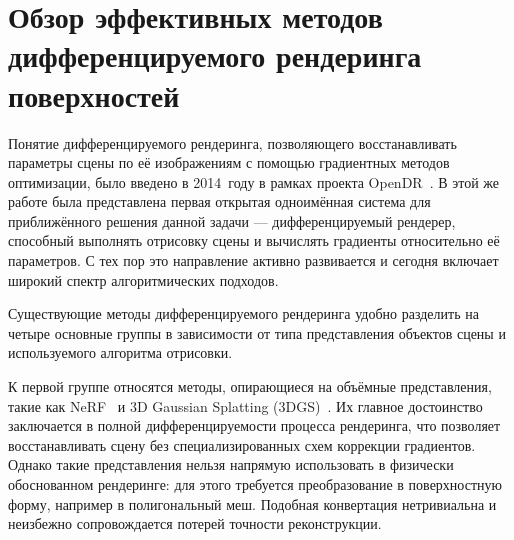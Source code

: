 \chapter{Обзор эффективных методов дифференцируемого рендеринга поверхностей}
\label{ch:chap1}

Понятие дифференцируемого рендеринга, позволяющего восстанавливать параметры
сцены по её изображениям с помощью градиентных методов оптимизации, было
введено в 2014~году в рамках проекта OpenDR~\cite{OpenDR2014}. В этой же работе
была представлена первая открытая одноимённая система для приближённого решения
данной задачи --- дифференцируемый рендерер, способный выполнять отрисовку сцены
и вычислять градиенты относительно её параметров. С тех пор это направление
активно развивается и сегодня включает широкий спектр алгоритмических подходов.

Существующие методы дифференцируемого рендеринга удобно разделить на четыре
основные группы в зависимости от типа представления объектов сцены и используемого
алгоритма отрисовки.

К первой группе относятся методы, опирающиеся на объёмные представления, такие
как NeRF~\cite{NeRF2020} и 3D Gaussian Splatting (3DGS)~\cite{3DGS}. Их главное
достоинство заключается в полной дифференцируемости процесса рендеринга, что
позволяет восстанавливать сцену без специализированных схем коррекции градиентов.
Однако такие представления нельзя напрямую использовать в физически обоснованном
рендеринге: для этого требуется преобразование в поверхностную форму, например
в полигональный меш. Подобная конвертация нетривиальна и неизбежно сопровождается
потерей точности реконструкции.

